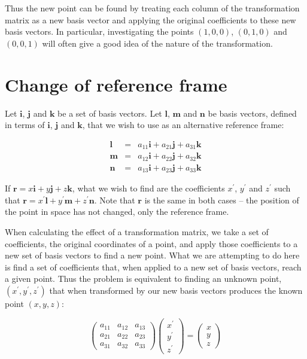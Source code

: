 \documentclass[a5paper]{article}
\begin{document}
Thus the new point can be found by treating each column of the transformation
matrix as a new basis vector and applying the original coefficients to these new
basis vectors. In particular, investigating the points $(1,0,0)$, $(0,1,0)$ and
$(0,0,1)$ will often give a good idea of the nature of the transformation.

\section*{Change of reference frame}

Let $\bm{i}$, $\bm{j}$ and $\bm{k}$ be a set of basis vectors. Let $\bm{l}$,
$\bm{m}$ and $\bm{n}$ be basis vectors, defined in terms of $\bm{i}$, $\bm{j}$
and $\bm{k}$, that we wish to use as an alternative reference frame:

\begin{eqnarray*}
    \bm{l} & = & a_{11}\bm{i} + a_{21}\bm{j} + a_{31}\bm{k} \\
    \bm{m} & = & a_{12}\bm{i} + a_{22}\bm{j} + a_{32}\bm{k} \\
    \bm{n} & = & a_{13}\bm{i} + a_{23}\bm{j} + a_{33}\bm{k}
\end{eqnarray*}

If $\bm{r} = x\bm{i} + y\bm{j} + z\bm{k}$, what we wish to find are the
coefficients $x^\prime$, $y^\prime$ and $z^\prime$ such that $\bm{r} =
x^\prime\bm{l} + y^\prime\bm{m} + z^\prime\bm{n}$. Note that $\bm{r}$ is the
same in both cases -- the position of the point in space has not changed, only
the reference frame.

When calculating the effect of a transformation matrix, we take a set of
coefficients, the original coordinates of a point, and apply those coefficients
to a new set of basis vectors to find a new point. What we are attempting to do
here is find a set of coefficients that, when applied to a new set of basis
vectors, reach a given point. Thus the problem is equivalent to finding an
unknown point, $(x^\prime, y^\prime, z^\prime)$ that when transformed by our new
basis vectors produces the known point $(x, y, z)$:

\begin{equation}
  \left(
  \begin{array}{ccc}
    a_{11} & a_{12} &a_{13} \\
    a_{21} & a_{22} &a_{23} \\
    a_{31} & a_{32} &a_{33}
  \end{array} \right)
  \left(
  \begin{array}{c}
    x^\prime\\ y^\prime\\ z^\prime
  \end{array} \right) =
  \left(
  \begin{array}{c}
    x\\ y\\ z
  \end{array} \right)
\end{equation}
\end{document}
